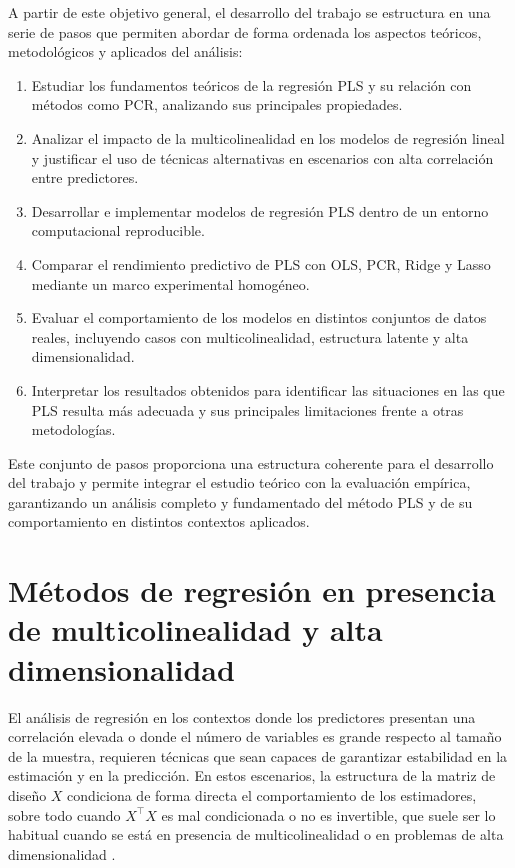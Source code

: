 \documentclass[12pt,a4paper]{report}
\begin{document}
A partir de este objetivo general, el desarrollo del trabajo se estructura en una serie de pasos que permiten abordar de forma ordenada los aspectos teóricos, metodológicos y aplicados del análisis:

\begin{enumerate}
    \item Estudiar los fundamentos teóricos de la regresión PLS y su relación con métodos como PCR, analizando sus principales propiedades.
    \item Analizar el impacto de la multicolinealidad en los modelos de regresión lineal y justificar el uso de técnicas alternativas en escenarios con alta correlación entre predictores.
    \item Desarrollar e implementar modelos de regresión PLS dentro de un entorno computacional reproducible.
    \item Comparar el rendimiento predictivo de PLS con OLS, PCR, Ridge y Lasso mediante un marco experimental homogéneo.
    \item Evaluar el comportamiento de los modelos en distintos conjuntos de datos reales, incluyendo casos con multicolinealidad, estructura latente y alta dimensionalidad.
    \item Interpretar los resultados obtenidos para identificar las situaciones en las que PLS resulta más adecuada y sus principales limitaciones frente a otras metodologías.
\end{enumerate}

Este conjunto de pasos proporciona una estructura coherente para el desarrollo del trabajo y permite integrar el estudio teórico con la evaluación empírica, garantizando un análisis completo y fundamentado del método PLS y de su comportamiento en distintos contextos aplicados.

\chapter{Métodos de regresión en presencia de multicolinealidad y alta dimensionalidad}

El análisis de regresión en los contextos donde los predictores presentan una correlación elevada o donde el número de variables es grande respecto al tamaño de la muestra, requieren técnicas que sean capaces de garantizar estabilidad en la estimación y  en la predicción. En estos escenarios, la estructura de la matriz de diseño \(X\)  condiciona de forma directa el comportamiento de los estimadores, sobre todo cuando \(X^\top X\) es mal condicionada o no es invertible, que suele ser lo habitual cuando se está en presencia de multicolinealidad o en problemas de alta dimensionalidad \cite{hastie2009}.
\end{document}
